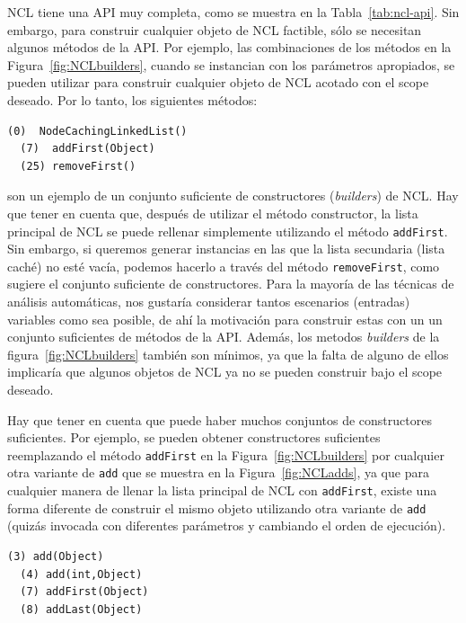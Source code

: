 NCL tiene una API muy completa, como se muestra en la Tabla~\ref{tab:ncl-api}. Sin embargo, para construir cualquier objeto de NCL factible, sólo se necesitan algunos métodos de la API. Por ejemplo, las combinaciones de los métodos en la Figura~\ref{fig:NCLbuilders}, cuando se instancian con los parámetros apropiados, se pueden utilizar para construir cualquier objeto de NCL acotado con el scope deseado. Por lo tanto, los siguientes métodos:
\\
\begin{lstlisting}[numbers=none,label=fig:NCLbuilders, caption=Conjunto de metodos sufiente para NCL]
  (0)  NodeCachingLinkedList()
  (7)  addFirst(Object)
  (25) removeFirst()
\end{lstlisting}

 son un ejemplo de un conjunto suficiente de constructores (\emph{builders}) de NCL. Hay que tener en cuenta que, después de utilizar el método constructor, la lista principal de NCL se puede rellenar simplemente utilizando el método \texttt{addFirst}. Sin embargo, si queremos generar instancias en las que la lista secundaria (lista caché) no esté vacía, podemos hacerlo a través del método \texttt{removeFirst}, como sugiere el conjunto suficiente de constructores. Para la mayoría de las técnicas de análisis automáticas, nos gustaría considerar tantos escenarios (entradas) variables como sea posible, de ahí la motivación para construir estas con un un conjunto suficientes de métodos de la API. Además, los metodos \emph{builders} de la figura~\ref{fig:NCLbuilders} también son mínimos, ya que la falta de alguno de ellos implicaría que algunos objetos de NCL ya no se pueden construir bajo el scope deseado.

Hay que tener en cuenta que puede haber muchos conjuntos de constructores suficientes. Por ejemplo, se pueden obtener constructores suficientes reemplazando el método \texttt{addFirst} en la Figura~\ref{fig:NCLbuilders} por cualquier otra variante de \texttt{add} que se muestra en la Figura~\ref{fig:NCLadds}, ya que para cualquier manera de llenar la lista principal de NCL con \texttt{addFirst}, existe una forma diferente de construir el mismo objeto utilizando otra variante de \texttt{add} (quizás invocada con diferentes parámetros y cambiando el orden de ejecución).
\\
\begin{lstlisting}[numbers=none,label=fig:NCLadds, caption=Variantes del método 'Add' que puedo ser utilizado para rellanar la lista principal en NCL, captionpos=b, frame=tb , basicstyle=\scriptsize]
  (3) add(Object)
  (4) add(int,Object)
  (7) addFirst(Object)
  (8) addLast(Object)
\end{lstlisting}


